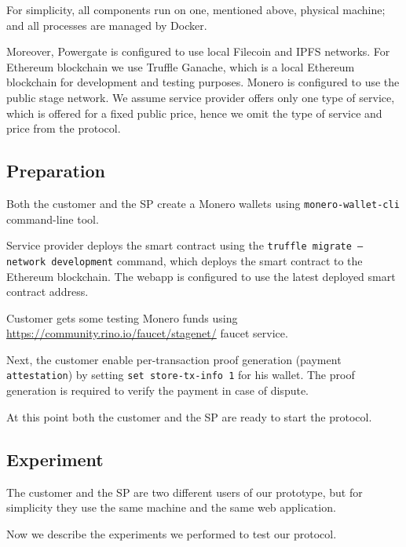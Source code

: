 \documentclass{ieeeaccess}
\begin{document}
For simplicity, all components run on one, mentioned above, physical machine; and all processes are managed by Docker. 

Moreover, Powergate is configured to use local Filecoin and IPFS networks.
For Ethereum blockchain we use Truffle Ganache, which is a local Ethereum blockchain for development and testing purposes. 
Monero is configured to use the public stage network.
We assume service provider offers only one type of service, which is offered for a fixed public price, hence we omit the type of service and price from the protocol.

\subsection*{Preparation}

Both the customer and the SP create a Monero wallets using \texttt{monero-wallet-cli} command-line tool.

Service provider deploys the smart contract using the \texttt{truffle migrate --network development} command, which deploys the smart contract to the Ethereum blockchain. The webapp is configured to use the latest deployed smart contract address.

Customer gets some testing Monero funds using \url{https://community.rino.io/faucet/stagenet/} faucet service.

Next, the customer enable per-transaction proof generation (payment \texttt{attestation}) by setting \texttt{set store-tx-info 1} for his wallet. The proof generation is required to verify the payment in case of dispute.

At this point both the customer and the SP are ready to start the protocol.

\subsection*{Experiment}

The customer and the SP are two different users of our prototype, but for simplicity they use the same machine and the same web application.

Now we describe the experiments we performed to test our protocol.
\end{document}
